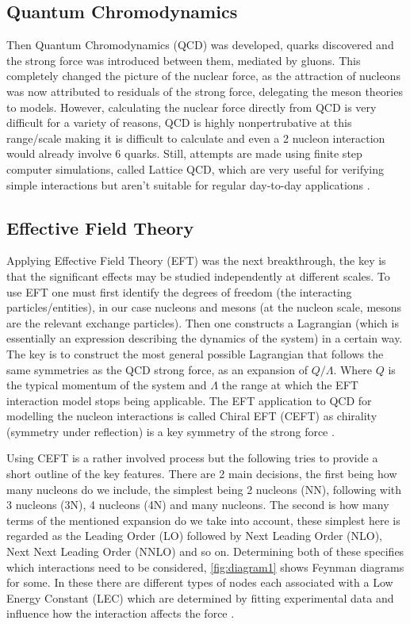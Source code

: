 \subsection{Quantum Chromodynamics}
Then Quantum Chromodynamics (QCD) was developed, quarks discovered and the strong force was introduced between them, mediated by gluons.
This completely changed the picture of the nuclear force, as the attraction of nucleons was now attributed to residuals of the strong force, delegating the meson theories to models.
However, calculating the nuclear force directly from QCD is very difficult for a variety of reasons, QCD is highly nonpertrubative at this range/scale making it is difficult to calculate and even a 2 nucleon interaction would already involve 6 quarks.
Still, attempts are made using finite step computer simulations, called Lattice QCD, which are very useful for verifying simple interactions but aren't suitable for regular day-to-day applications \cite{machleidt_nuclear_2013, hergert_guided_2020}.

\subsection{Effective Field Theory}
Applying Effective Field Theory (EFT) was the next breakthrough, the key is that the significant effects may be studied independently at different scales.
To use EFT one must first identify the degrees of freedom (the interacting particles/entities), in our case nucleons and mesons (at the nucleon scale, mesons are the relevant exchange particles).
Then one constructs a Lagrangian (which is essentially an expression describing the dynamics of the system) in a certain way.
The key is to construct the most general possible Lagrangian that follows the same symmetries as the QCD strong force, as an expansion of $Q/\Lambda$.
Where $Q$ is the typical momentum of the system and $\Lambda$ the range at which the EFT interaction model stops being applicable.
The EFT application to QCD for modelling the nucleon interactions is called Chiral EFT (CEFT) as chirality (symmetry under reflection) is a key symmetry of the strong force \cite{machleidt_chiral_2011, machleidt_nuclear_2013, burgess_introduction_2007, hergert_guided_2020}.

Using CEFT is a rather involved process but the following tries to provide a short outline of the key features.
There are 2 main decisions, the first being how many nucleons do we include, the simplest being 2 nucleons (NN), following with 3 nucleons (3N), 4 nucleons (4N) and many nucleons.
The second is how many terms of the mentioned expansion do we take into account, these simplest here is regarded as the Leading Order (LO) followed by Next Leading Order (NLO), Next Next Leading Order (NNLO) and so on.
Determining both of these specifies which interactions need to be considered, \cref{fig:diagram1} shows Feynman diagrams for some.
In these there are different types of nodes each associated with a Low Energy Constant (LEC) which are determined by fitting experimental data and influence how the interaction affects the force \cite{machleidt_chiral_2011, machleidt_nuclear_2013, burgess_introduction_2007, hergert_guided_2020}.

